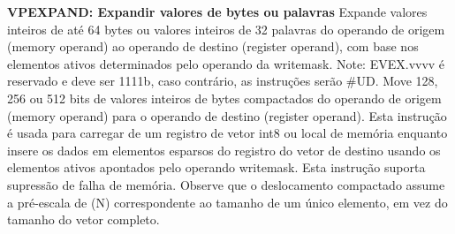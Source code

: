 \documentclass[12pt,a4paper,brazilian,utf8]{ppgsi}
\begin{document}
    \textbf{VPEXPAND: Expandir valores de bytes ou palavras}
    Expande valores inteiros de até 64 bytes ou valores inteiros de 32 palavras do operando de origem (memory operand) ao operando de destino (register operand), com base nos elementos ativos determinados pelo operando da writemask. Note: EVEX.vvvv é reservado e deve ser 1111b, caso contrário, as instruções serão \#UD. Move 128, 256 ou 512 bits de valores inteiros de bytes compactados do operando de origem (memory operand) para o operando de destino  (register operand). Esta instrução é usada para carregar de um registro de vetor int8 ou local de memória enquanto insere os dados em elementos esparsos do registro do vetor de destino usando os elementos ativos apontados pelo operando writemask. Esta instrução suporta supressão de falha de memória. Observe que o deslocamento compactado assume a pré-escala de (N) correspondente ao tamanho de um único elemento, em vez do tamanho do vetor completo.
\end{document}
